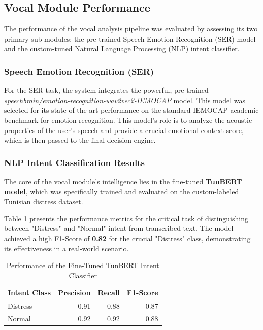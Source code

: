 \documentclass[12pt,a4paper,oneside,english]{book}
\begin{document}
    \subsection{Vocal Module Performance}
\label{subsec:vocal_results}

The performance of the vocal analysis pipeline was evaluated by assessing its two primary sub-modules: the pre-trained Speech Emotion Recognition (SER) model and the custom-tuned Natural Language Processing (NLP) intent classifier.

\subsubsection{Speech Emotion Recognition (SER)}
For the SER task, the system integrates the powerful, pre-trained \textit{speechbrain/emotion-recognition-wav2vec2-IEMOCAP} model. 
This model was selected for its state-of-the-art performance on the standard IEMOCAP academic benchmark for emotion recognition. 
This model's role is to analyze the acoustic properties of the user's speech and provide a crucial emotional context score, which is then passed to the final decision engine.

\subsubsection{NLP Intent Classification Results}
The core of the vocal module's intelligence lies in the fine-tuned \textbf{TunBERT model}, which was specifically trained and evaluated on the custom-labeled Tunisian distress dataset. 

Table \ref{tab:nlp_results} presents the performance metrics for the critical task of distinguishing between "Distress" and "Normal" intent from transcribed text. The model achieved a high F1-Score of \textbf{0.82} for the crucial "Distress" class, demonstrating its effectiveness in a real-world scenario.

\begin{table}[h!]
    \centering
    \caption{Performance of the Fine-Tuned TunBERT Intent Classifier}
    \label{tab:nlp_results}
    \begin{tabular}{lrrr}
        \hline
        \textbf{Intent Class} & \textbf{Precision} & \textbf{Recall} & \textbf{F1-Score} \\ \hline
        Distress              & 0.91               & 0.88            & 0.87              \\
        Normal                & 0.92               & 0.92            & 0.88              \\ \hline
    \end{tabular}
\end{table}
\end{document}
